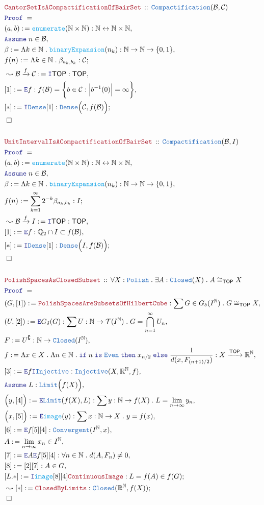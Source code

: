 \documentclass[12pt]{scrartcl}
\newcommand{\TYPE}[1]{\textcolor{NavyBlue}{\mathtt{#1}}}
\newcommand{\FUNC}[1]{\textcolor{Cerulean}{\mathtt{#1}}}
\newcommand{\LOGIC}[1]{\textcolor{Blue}{\mathtt{#1}}}
\newcommand{\THM}[1]{\textcolor{Maroon}{\mathtt{#1}}}
\renewcommand{\.}{\; . \;}
\newcommand{\de}{: \kern 0.1pc =}
\newcommand{\If}{\LOGIC{if} \;}
\newcommand{\Then}{ \; \LOGIC{then} \;}
\newcommand{\Else}{\; \LOGIC{else} \;}
\newcommand{\Theorem}[2]{& \THM{#1} \, :: \, #2 \\ & \Proof = \\ }
\newcommand{\Page}[1]{ \begin{align*} #1 \end{align*}   }
\newcommand{\Intro}{\LOGIC{I}}
\newcommand{\Elim}{\LOGIC{E}}
\newcommand{\Reals}{\mathbb{R} }
\newcommand{\Rats}{\mathbb{Q} }
\newcommand{\Nat}{\mathbb{N} }
\newcommand{\ToBij}{\leftrightarrow}
\newcommand{\Arrow}{\xrightarrow}
\renewcommand{\c}{\complement}
\newcommand{\Say}[3]{& #1 \de #2 : #3, \\}
\newcommand{\SayIn}[3]{& #1 \de #2 \in #3, \\}
\newcommand{\Conclude}[3]{& #1 \de #2 : #3; \\}
\newcommand{\Derive}[3]{& \leadsto #1 \de #2 : #3, \\}
\newcommand{\DeriveConclude}[3]{& \leadsto #1 \de #2 : #3 ; \\}
\newcommand{\Assume}[2]{& \LOGIC{Assume} \; #1 : #2, \\}
\newcommand{\AssumeIn}[2]{& \LOGIC{Assume} \; #1 \in #2, \\}
\newcommand{\QED}{\; \square}
\newcommand{\EndProof}{& \QED \\}
\newcommand{\Proof}{\LOGIC{Proof} \; }
\newcommand{\C}{\mathcal{C}}
\newcommand{\B}{\mathcal{B}}
\newcommand{\TOP}{\mathsf{TOP}}
\newcommand{\T}{\mathcal{T}}
\newcommand{\Polish}{\TYPE{Polish}}
\begin{document}
\Page{
	\Theorem{CantorSetIsACompactificationOfBairSet}
	{
		\TYPE{Compactification}(\B,\C)
	}
	\Say{(a,b)}{\FUNC{enumerate}(\Nat \times \Nat)}{\Nat \ToBij \Nat \times \Nat}
	\AssumeIn{n}{\B}
	\Say{\beta}{\Lambda k \in \Nat \. \FUNC{binaryExpansion}(n_k)}
	{
		\Nat \to \Nat \to \{0,1\}
	}
	\Conclude{f(n)}{\Lambda k \in \Nat \. \beta_{a_k,b_k}}
	{
		\C
	}
	\Derive{\B \Arrow{f} \C}{\Intro \TOP}{\TOP}
	\Say{[1]}{\Elim f}{f(\B) =  \bigg\{ b \in \C : \Big| b^{-1}(0) \Big| = \infty  \bigg\}}
	\Conclude{[*]}{\Intro \TYPE{Dense}[1]}{\TYPE{Dense}\Big(\C,f(\B)\Big)}
	\EndProof
	\\
	\Theorem{UnitIntervalIsACompactificationOfBairSet}
	{
		\TYPE{Compactification}(\B,I)
	}
	\Say{(a,b)}{\FUNC{enumerate}(\Nat \times \Nat)}{\Nat \ToBij \Nat \times \Nat}
	\AssumeIn{n}{\B}
	\Say{\beta}{\Lambda k \in \Nat \. \FUNC{binaryExpansion}(n_k)}
	{
		\Nat \to \Nat \to \{0,1\}
	}
	\Conclude{f(n)}{\sum^\infty_{k=1} 2^{-k}\beta_{a_k,b_k}}
	{
		I
	}
	\Derive{\B \Arrow{f} I}{\Intro \TOP}{\TOP}
	\Say{[1]}{\Elim f}{\Rats_2 \cap I \subset f(\B) }
	\Conclude{[*]}{\Intro \TYPE{Dense}[1]}{\TYPE{Dense}\Big(I,f(\B)\Big)}
	\EndProof
	\\
	\Theorem{PolishSpacesAsClosedSubset}
	{
		\forall X : \Polish \.
		\exists A : \TYPE{Closed}(X) \.
		A \cong_\TOP X
	}
	\Say{(G,[1])}
	{
		\THM{PolishSpacesAreSubsetsOfHilbertCube}
	}
	{
		\sum G \in G_\delta(I^\Nat) \. G \cong_{\TOP} X
	}
	\Say{(U,[2])}
	{
		\Elim G_\delta(G)
	}
	{
		\sum U : \Nat \to \T(I^\Nat) \.
		G = \bigcap^\infty_{n=1} U_n
	}
	\Say{F}{U^\c}{\Nat \to \TYPE{Closed}(I^\Nat) }
	\Say{f}
	{
		\Lambda x \in X \.
		\Lambda n \in \Nat \.
		\If n \; \LOGIC{is} \; \TYPE{Even} \Then
		x_{n/2} \Else 
		\frac{1}{d(x,F_{(n+1)/2})}
	}
	{
		X \Arrow{\TOP} \Reals^\Nat
	}
	\Say{[3]}{\Elim f \Intro \TYPE{Injective}}
	{
		\TYPE{Injective}(X,\Reals^\Nat,f)
	}
	\Assume{L}
	{
		\TYPE{Limit}\Big( f(X)\Big)
	}
	\Say{\Big(y,[4]\Big)}{\Elim \TYPE{Limit}(f(X),L)}
	{
		\sum y : \Nat \to  f(X) \.
		L = \lim_{n \to \infty} y_n
	}
	\Say{\Big( x, [5]\Big)}
	{
		\Elim \FUNC{image} (y)
	}
	{
		\sum x : \Nat \to X \. y = f(x)
	}
	\Say{[6]}{\Elim f [5][4]}{\TYPE{Convergent}(I^\Nat,x)}
	\SayIn{A}{\lim_{n \to \infty} x_n}{I^\Nat}
	\Say{[7]}{\Elim A \Elim f [5][4]}
	{
		\forall n \in \Nat \. 
		d(A,F_n) \neq 0
	}
	\Say{[8]}{[2][7]}{A \in G}
	\Conclude{[L.*]}{\Intro \FUNC{image}[8][4]\THM{ContinuousImage}}
	{
		L = f(A)  \in f(G)
	}
	\DeriveConclude{[*]}{\THM{ClosedByLimits}}{\TYPE{Closed}(\Reals^\Nat,f(X))}
	\EndProof
}
\newpage
\end{document}
